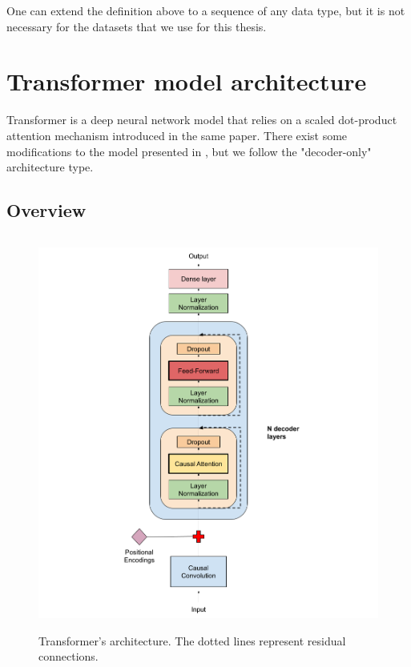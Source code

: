 \documentclass[en]{pracamgr}
\begin{document}
One can extend the definition above to a sequence of any data type, but it is not necessary for the datasets that we use for this thesis.

%
%
%

\section{Transformer model architecture}

Transformer \cite{tr} is a deep neural network model that relies on a scaled dot-product attention mechanism introduced in the same paper. There exist some modifications to the model presented in \cite{tr}, but we follow the "decoder-only" \cite{wikipedia} architecture type.

\subsection{Overview}

\begin{figure}[ht!]
	\centering
	\includegraphics[height=130mm]{decoder3.png}
	\caption{Transformer's architecture. The dotted lines represent residual connections. \label{our-decoder}}
\end{figure}
\end{document}
